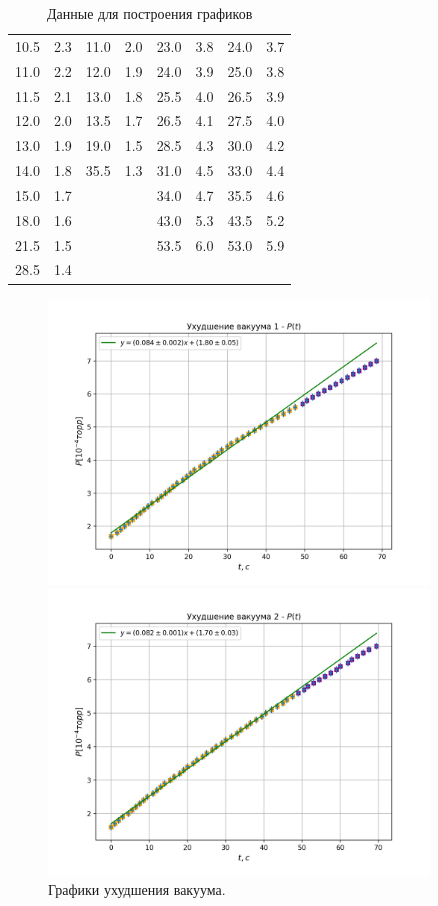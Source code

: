 \documentclass{article}
\begin{document}
\begin{table}[!h]
\begin{center}
\begin{tabular}{rr|rr|rr|rr}
    10.5 &  2.3 & 11.0 &  2.0 & 23.0 & 3.8 & 24.0 & 3.7 \\
    11.0 &  2.2 & 12.0 &  1.9 & 24.0 & 3.9 & 25.0 & 3.8 \\
    11.5 &  2.1 & 13.0 &  1.8 & 25.5 & 4.0 & 26.5 & 3.9 \\
    12.0 &  2.0 & 13.5 &  1.7 & 26.5 & 4.1 & 27.5 & 4.0 \\\hline
    13.0 &  1.9 & 19.0 &  1.5 & 28.5 & 4.3 & 30.0 & 4.2 \\
    14.0 &  1.8 & 35.5 &  1.3 & 31.0 & 4.5 & 33.0 & 4.4 \\
    15.0 &  1.7 &      &      & 34.0 & 4.7 & 35.5 & 4.6 \\
    18.0 &  1.6 &      &      & 43.0 & 5.3 & 43.5 & 5.2 \\
    21.5 &  1.5 &      &      & 53.5 & 6.0 & 53.0 & 5.9 \\
    28.5 &  1.4 &      &      &      &     &      &     \\
    \bottomrule
    \end{tabular}
    \end{center}
    \caption{Данные для построения графиков}
    \label{plot_data}
    \end{table}


    \begin{figure}[h]
        \centerline{\includegraphics[width=0.9\textwidth]{cccnum_1}}
        \centerline{\includegraphics[width=0.9\textwidth]{cccnum_2}}
        \caption{Графики ухудшения вакуума.}
        \label{ris:cccnum}
    \end{figure}
\end{document}
